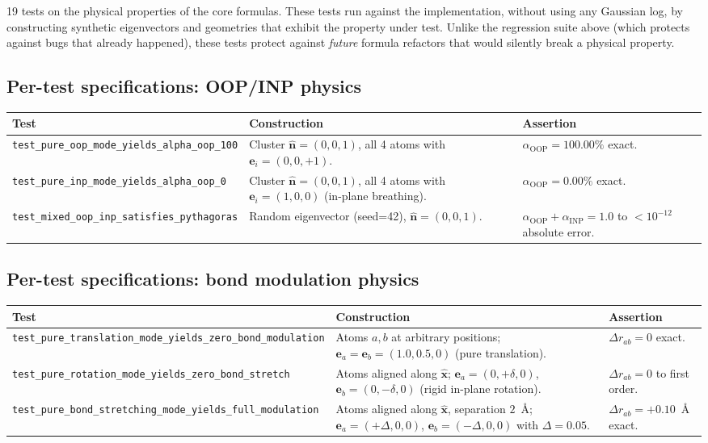 \documentclass[10pt,a4paper,twoside]{article}
\newcommand{\evec}{\mathbf{e}}
\newcommand{\xhat}{\hat{\mathbf{x}}}
\newcommand{\nhat}{\hat{\mathbf{n}}}
\newcommand{\OOP}{\mathrm{OOP}}
\newcommand{\INP}{\mathrm{INP}}
\begin{document}
19 tests on the physical properties of the core formulas. These
tests run against the implementation, without using any Gaussian
log, by constructing synthetic eigenvectors and geometries that
exhibit the property under test. Unlike the regression suite
above (which protects against bugs that already happened), these
tests protect against \emph{future} formula refactors that would
silently break a physical property.

\subsection{Per-test specifications: OOP/INP physics}

\begin{longtable}{p{} p{} p{}}
\toprule
\textbf{Test} & \textbf{Construction} & \textbf{Assertion} \\
\midrule
\texttt{test\_pure\_oop\_mode\_yields\_alpha\_oop\_100}
 & Cluster $\nhat = (0,0,1)$, all 4 atoms with $\evec_i = (0, 0, +1)$.
 & $\alpha_{\OOP} = 100.00\%$ exact. \\
\midrule
\texttt{test\_pure\_inp\_mode\_yields\_alpha\_oop\_0}
 & Cluster $\nhat = (0,0,1)$, all 4 atoms with
   $\evec_i = (1, 0, 0)$ (in-plane breathing).
 & $\alpha_{\OOP} = 0.00\%$ exact. \\
\midrule
\texttt{test\_mixed\_oop\_inp\_satisfies\_pythagoras}
 & Random eigenvector (seed=42), $\nhat = (0,0,1)$.
 & $\alpha_{\OOP} + \alpha_{\INP} = 1.0$ to $< 10^{-12}$
   absolute error. \\
\bottomrule
\end{longtable}

\subsection{Per-test specifications: bond modulation physics}

\begin{longtable}{p{} p{} p{}}
\toprule
\textbf{Test} & \textbf{Construction} & \textbf{Assertion} \\
\midrule
\texttt{test\_pure\_translation\_mode\_yields\_zero\_bond\_modulation}
 & Atoms $a, b$ at arbitrary positions; $\evec_a = \evec_b
   = (1.0, 0.5, 0)$ (pure translation).
 & $\Delta r_{ab} = 0$ exact. \\
\midrule
\texttt{test\_pure\_rotation\_mode\_yields\_zero\_bond\_stretch}
 & Atoms aligned along $\xhat$; $\evec_a = (0, +\delta, 0)$,
   $\evec_b = (0, -\delta, 0)$ (rigid in-plane rotation).
 & $\Delta r_{ab} = 0$ to first order. \\
\midrule
\texttt{test\_pure\_bond\_stretching\_mode\_yields\_full\_modulation}
 & Atoms aligned along $\xhat$, separation $2$~\AA{};
   $\evec_a = (+\Delta, 0, 0)$, $\evec_b = (-\Delta, 0, 0)$
   with $\Delta = 0.05$.
 & $\Delta r_{ab} = +0.10$~\AA{} exact. \\
\bottomrule
\end{longtable}
\end{document}
